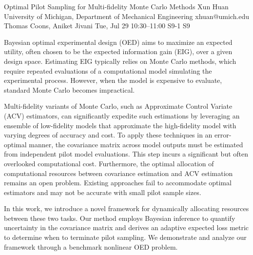 \begin{talk}
  {Optimal Pilot Sampling for Multi-fidelity Monte Carlo Methods}%
  {Xun Huan}%
  {University of Michigan, Department of Mechanical Engineering}%
  {xhuan@umich.edu}%
  {Thomas Coons, Aniket Jivani}%
  {}%
  {Tue, Jul 29 10:30--11:00}%
  {S9-1}%
  {S9}%
  
    

Bayesian optimal experimental design (OED) aims to maximize an expected utility, often chosen to be the expected information gain (EIG), over a given design space. Estimating EIG typically relies on Monte Carlo methods, which require repeated evaluations of a computational model simulating the experimental process. 
However, when the model is expensive to evaluate, standard Monte Carlo becomes impractical.

Multi-fidelity variants of Monte Carlo, such as Approximate Control Variate (ACV) estimators, can significantly expedite such estimations by leveraging an ensemble of low-fidelity models that approximate the high-fidelity model with varying degrees of accuracy and cost. 
To apply these techniques in an error-optimal manner, the covariance matrix across model outputs must be estimated from independent pilot model evaluations. This step incurs a significant but often overlooked computational cost. 
Furthermore, the optimal allocation of computational resources between 
covariance estimation and 
ACV estimation remains an open problem.  Existing approaches fail to accommodate optimal estimators and may not be accurate with small pilot sample sizes.

In this work, we introduce a novel framework for dynamically allocating resources between these two tasks.
Our method employs Bayesian inference
to quantify uncertainty in the covariance matrix and derives an adaptive expected loss metric
to determine when to terminate pilot sampling. 
We demonstrate and analyze our framework through a benchmark nonlinear OED problem. 


\end{talk}
